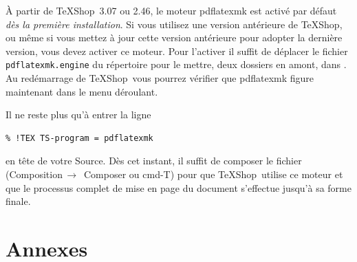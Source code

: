 \documentclass[11pt,french]{article}
\newcommand{\TS}{\textsf{\TeX Shop}}
\newcommand{\cmd}[1]{\textsf{#1}}
\newcommand{\mnu}[1]{\textsf{#1}}
\newcommand{\To}{\,\(\to\)\,}
\begin{document}
À partir de \TS\ 3.07 ou 2.46, le moteur pdflatexmk est activé par défaut \emph{dès la première installation}. Si vous utilisez une version antérieure de \TS, ou même si vous mettez à jour cette version antérieure pour adopter la dernière version, vous devez activer ce moteur. Pour l'activer il suffit de déplacer le fichier \texttt{pdflatexmk.engine} du répertoire  pour le mettre, deux dossiers en amont, dans . Au redémarrage de \TS\ vous pourrez vérifier que \cmd{pdflatexmk} figure maintenant dans le menu déroulant.

Il ne reste plus qu'à entrer la ligne
\begin{verbatim}
% !TEX TS-program = pdflatexmk
\end{verbatim}
en tête de votre Source. Dès cet instant, il suffit de composer le fichier (\mnu{Composition}\To{} \mnu{Composer} ou \cmd{cmd-T}) pour que \TS\ utilise ce moteur et que le processus complet de mise en page du document s'effectue jusqu'à sa forme finale. 

\section*{Annexes}
\appendix

\end{document}
